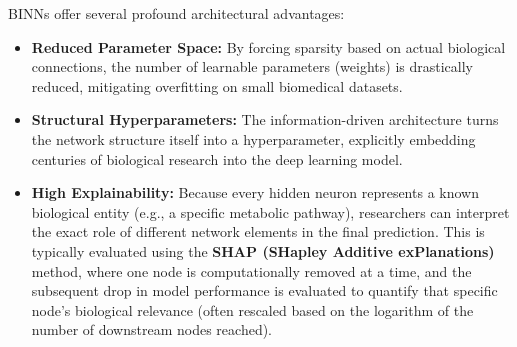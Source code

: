 BINNs offer several profound architectural advantages:
\begin{itemize}
    \item \textbf{Reduced Parameter Space:} By forcing sparsity based on actual biological connections, the number of learnable parameters (weights) is drastically reduced, mitigating overfitting on small biomedical datasets.
    \item \textbf{Structural Hyperparameters:} The information-driven architecture turns the network structure itself into a hyperparameter, explicitly embedding centuries of biological research into the deep learning model.
    \item \textbf{High Explainability:} Because every hidden neuron represents a known biological entity (e.g., a specific metabolic pathway), researchers can interpret the exact role of different network elements in the final prediction. This is typically evaluated using the \textbf{SHAP (SHapley Additive exPlanations)} method, where one node is computationally removed at a time, and the subsequent drop in model performance is evaluated to quantify that specific node's biological relevance (often rescaled based on the logarithm of the number of downstream nodes reached).
\end{itemize}